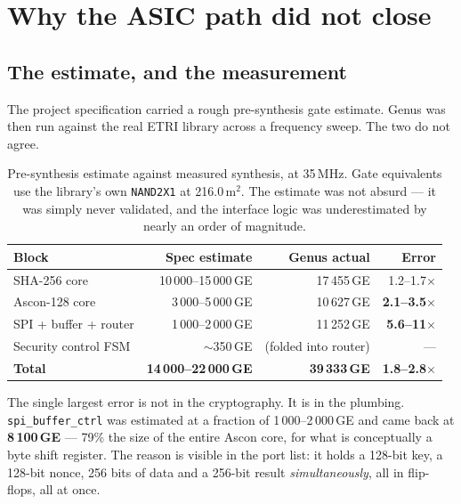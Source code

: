 \documentclass[11pt,a4paper]{article}
\begin{document}
\section{Why the ASIC path did not close}\label{sec:asic}

\subsection{The estimate, and the measurement}

The project specification carried a rough pre-synthesis gate estimate. Genus
was then run against the real ETRI library across a frequency sweep. The two
do not agree.

\begin{table}[h]
\centering\small
\begin{tabular}{@{}lrrr@{}}
\toprule
\textbf{Block} & \textbf{Spec estimate} & \textbf{Genus actual} & \textbf{Error} \\
\midrule
SHA-256 core & 10\,000--15\,000\,GE & 17\,455\,GE & 1.2--1.7$\times$ \\
Ascon-128 core & 3\,000--5\,000\,GE & 10\,627\,GE & \textbf{2.1--3.5$\times$} \\
SPI + buffer + router & 1\,000--2\,000\,GE & 11\,252\,GE & \textbf{5.6--11$\times$} \\
Security control FSM & $\sim$350\,GE & (folded into router) & --- \\
\midrule
\textbf{Total} & \textbf{14\,000--22\,000\,GE} & \textbf{39\,333\,GE} &
\textbf{1.8--2.8$\times$} \\
\bottomrule
\end{tabular}
\caption{Pre-synthesis estimate against measured synthesis, at 35\,MHz.
Gate equivalents use the library's own \texttt{NAND2X1} at
216.0\,\textmu m$^2$. The estimate was not absurd --- it was simply never
validated, and the interface logic was underestimated by nearly an order of
magnitude.}
\label{tab:estimate}
\end{table}

The single largest error is not in the cryptography. It is in the plumbing.
\texttt{spi\_buffer\_ctrl} was estimated at a fraction of 1\,000--2\,000\,GE
and came back at \textbf{8\,100\,GE} --- 79\% the size of the entire Ascon
core, for what is conceptually a byte shift register. The reason is visible in
the port list: it holds a 128-bit key, a 128-bit nonce, 256 bits of data and a
256-bit result \emph{simultaneously}, all in flip-flops, all at once.
\end{document}
